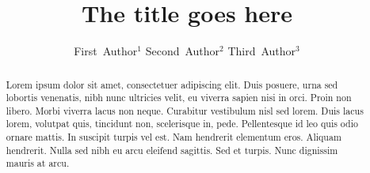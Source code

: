 \documentclass[twoside]{ASDJ}
\begin{document}



\author{ First~Author$^1$  \newline
         Second~Author$^2$ \newline
         Third~Author$^3$}






\title{The title goes here}


\maketitle



\begin{abstract}
Lorem ipsum dolor sit amet, consectetuer adipiscing elit. Duis posuere, urna sed lobortis venenatis, nibh nunc ultricies velit, eu viverra sapien nisi in orci. Proin non libero. Morbi viverra lacus non neque. Curabitur vestibulum nisl sed lorem. Duis lacus lorem, volutpat quis, tincidunt non, scelerisque in, pede. Pellentesque id leo quis odio ornare mattis. In suscipit turpis vel est. Nam hendrerit elementum eros. Aliquam hendrerit. Nulla sed nibh eu arcu eleifend sagittis. Sed et turpis. Nunc dignissim mauris at arcu.
\end{abstract}



\end{document}
